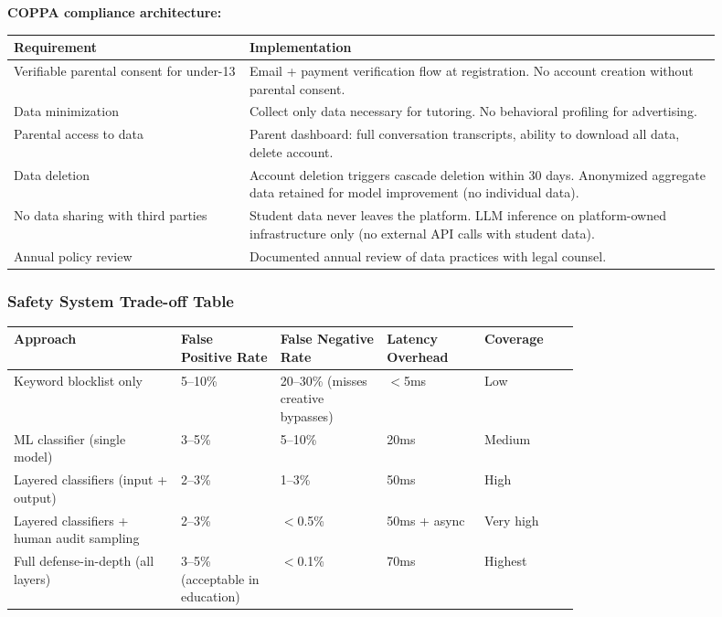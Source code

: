 \textbf{COPPA compliance architecture:}

\begin{tabular}{|p{0.30\linewidth}|p{0.60\linewidth}|}
\hline
\textbf{Requirement} & \textbf{Implementation} \\
\hline
Verifiable parental consent for under-13 & Email + payment verification flow at registration. No account creation without parental consent. \\
\hline
Data minimization & Collect only data necessary for tutoring. No behavioral profiling for advertising. \\
\hline
Parental access to data & Parent dashboard: full conversation transcripts, ability to download all data, delete account. \\
\hline
Data deletion & Account deletion triggers cascade deletion within 30 days. Anonymized aggregate data retained for model improvement (no individual data). \\
\hline
No data sharing with third parties & Student data never leaves the platform. LLM inference on platform-owned infrastructure only (no external API calls with student data). \\
\hline
Annual policy review & Documented annual review of data practices with legal counsel. \\
\hline
\end{tabular}

\subsubsection*{Safety System Trade-off Table}

\begin{tabular}{|p{0.22\linewidth}|p{0.12\linewidth}|p{0.14\linewidth}|p{0.12\linewidth}|p{0.12\linewidth}|}
\hline
\textbf{Approach} & \textbf{False Positive Rate} & \textbf{False Negative Rate} & \textbf{Latency Overhead} & \textbf{Coverage} \\
\hline
Keyword blocklist only & 5--10\% & 20--30\% (misses creative bypasses) & $<$5ms & Low \\
\hline
ML classifier (single model) & 3--5\% & 5--10\% & 20ms & Medium \\
\hline
Layered classifiers (input + output) & 2--3\% & 1--3\% & 50ms & High \\
\hline
Layered classifiers + human audit sampling & 2--3\% & $<$0.5\% & 50ms + async & Very high \\
\hline
Full defense-in-depth (all layers) & 3--5\% (acceptable in education) & $<$0.1\% & 70ms & Highest \\
\hline
\end{tabular}

